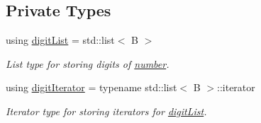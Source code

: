 \subsection*{Private Types}
\begin{DoxyCompactItemize}
\item 
\hypertarget{classcjr_1_1number_a64ca3e7862f3f4940065b93d38c1a465}{using \hyperlink{classcjr_1_1number_a64ca3e7862f3f4940065b93d38c1a465}{digit\-List} = std\-::list$<$ B $>$}\label{classcjr_1_1number_a64ca3e7862f3f4940065b93d38c1a465}

\begin{DoxyCompactList}\small\item\em List type for storing digits of \hyperlink{classcjr_1_1number}{number}. \end{DoxyCompactList}\item 
\hypertarget{classcjr_1_1number_a137416a57d724f8b6a5c14bab7c6802b}{using \hyperlink{classcjr_1_1number_a137416a57d724f8b6a5c14bab7c6802b}{digit\-Iterator} = typename std\-::list$<$ B $>$\-::iterator}\label{classcjr_1_1number_a137416a57d724f8b6a5c14bab7c6802b}

\begin{DoxyCompactList}\small\item\em Iterator type for storing iterators for \hyperlink{classcjr_1_1number_a64ca3e7862f3f4940065b93d38c1a465}{digit\-List}. \end{DoxyCompactList}\end{DoxyCompactItemize}
